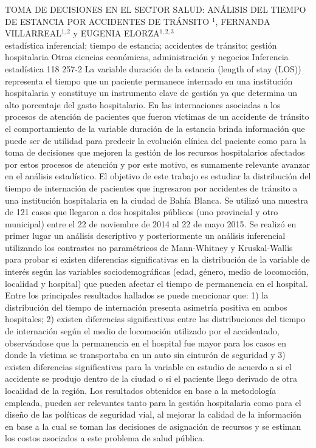 \A
{TOMA DE DECISIONES EN EL SECTOR SALUD: ANÁLISIS DEL TIEMPO DE ESTANCIA POR ACCIDENTES DE TRÁNSITO}
{$^1$, FERNANDA VILLARREAL$^{1,2}$ y EUGENIA ELORZA$^{1,2,3}$}
{
\\}
{estadística inferencial; tiempo de estancia; accidentes de tránsito; gestión hospitalaria} 
 {Otras ciencias económicas, administración y negocios} 
 {Inferencia estadística} 
 {118} 
 {257-2}
{La variable duración de la estancia (length of stay (LOS)) representa el tiempo que un paciente permanece internado en una institución hospitalaria y constituye un instrumento clave de gestión ya que determina un alto porcentaje del gasto hospitalario. En las internaciones asociadas a los procesos de atención de pacientes que fueron víctimas de un accidente de tránsito el comportamiento de la variable duración de la estancia brinda información que puede ser de utilidad para predecir la evolución clínica del paciente como para la toma de decisiones que mejoren la gestión de los recursos hospitalarios afectados por estos procesos de atención y por este motivo, es sumamente relevante avanzar en el análisis estadístico. El objetivo de este trabajo es estudiar la distribución del tiempo de internación de pacientes que ingresaron por accidentes de tránsito a una institución hospitalaria en la ciudad de Bahía Blanca. Se utilizó una muestra de 121 casos que llegaron a dos hospitales públicos (uno provincial y otro municipal) entre el 22 de noviembre de 2014 al 22 de mayo 2015. Se realizó en primer lugar un análisis descriptivo y posteriormente un análisis inferencial utilizando los contrastes no paramétricos de Mann-Whitney y Kruskal-Wallis para probar si existen diferencias significativas en la distribución de la variable de interés según las variables sociodemográficas (edad, género, medio de locomoción, localidad y hospital) que pueden afectar el tiempo de permanencia en el hospital. Entre los principales resultados hallados se puede mencionar que: 1) la distribución del tiempo de internación presenta asimetría positiva en ambos hospitales; 2) existen diferencias significativas entre las distribuciones del tiempo de internación según el medio de locomoción utilizado por el accidentado, observándose que la permanencia en el hospital fue mayor para los casos en donde la víctima se transportaba en un auto sin cinturón de seguridad y 3) existen diferencias significativas para la variable en estudio de acuerdo a si el accidente se produjo dentro de la ciudad o si el paciente llego derivado de otra localidad de la región. Los resultados obtenidos en base a la metodología empleada, pueden ser relevantes tanto para la gestión hospitalaria como para el diseño de las políticas de seguridad vial, al mejorar la calidad de la información en base a la cual se toman las decisiones de asignación de recursos y se estiman los costos asociados a este problema de salud pública. }
